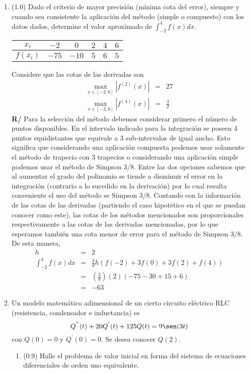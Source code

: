 \documentclass[12pt]{article}
\begin{document}
  \begin{enumerate}[leftmargin=*,widest=9]
    \item (\(1.0\)) Dado el criterio de mayor precisión (mínima cota del error), siempre y cuando sea consistente la aplicación del método (simple o compuesto) con los datos dados, determine el valor aproximado de \(\int_{-2}^4 f(x)dx\).
    
\begin{center}
\begin{tabular}{|c|c|c|c|c|c|}
\hline
$x_i$ & $-2$ & $0$ & $2$ & $4$ & $6$\\ \hline
$f(x_i)$ & $-75$ & $-10$ & $5$ & $6$ & $5$\\
\hline
\end{tabular}
\end{center}
Considere que las cotas de las derivadas son 
\begin{eqnarray*}
\max_{x\in [-2,6]} |f^{(2)}(x)| &=& 27 \\
\max_{x\in [-2,6]} |f^{(4)}(x)| &=& \frac{3}{2}
\end{eqnarray*}
\textbf{R/} Para la selección del método debemos considerar primero el número de puntos disponibles. En el intervalo indicado para la integración se poseen 4 puntos equidistantes que equivale a 3 sub-intervalos de igual ancho. Esto significa que considerando una aplicación compuesta podemos usar solamente el método de trapecio con 3 trapecios o considerando una aplicación simple podemos usar el método de Simpson 3/8.
Entre las dos opciones sabemos que al aumentar el grado del polinomio se tiende a disminuir el error en la integración (contrario a lo sucedido en la derivación) por lo cual resulta conveniente el uso del método se Simpson 3/8. Contando con la información de las cotas de las derivadas (partiendo el caso hipotético en el que se puedan conocer como este), las cotas de los métodos mencionados son proporcionales respectivamente a las cotas de las derivadas mencionadas, por lo que esperamos también una cota menor de error para el método de Simpson 3/8.
De esta manera, 
\begin{eqnarray*}
h & = & 2\\
\int_{-2}^{4}f(x)dx &=& \frac{3}{8}h\left(f(-2) + 3f(0) + 3f(2) + f(4) \right)\\
&=& \left(\frac{3}{8}\right)(2)(-75-30+15+6)\\
&=&-63
\end{eqnarray*}
\item Un modelo matemático adimensional de un cierto circuito eléctrico RLC (resistencia, condensador e inductancia) es $$Q^{''}(t)+20Q^{'}(t)+125Q(t)=9\sen(3t) $$ con $Q(0)=0$ y $Q^{'}(0)=0$. Se desea conocer \(Q(2)\).
    \begin{enumerate}[label=\alph*]
    \item (\(0.9\)) Halle el problema de valor inicial en forma del sistema de ecuaciones diferenciales de orden uno equivalente.
    

\end{enumerate}
\end{enumerate}
\end{document}
